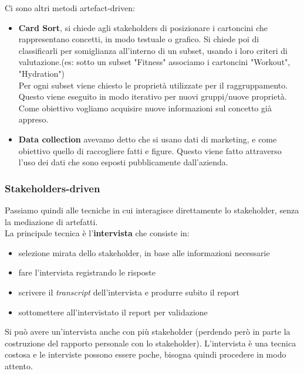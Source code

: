 Ci sono altri metodi artefact-driven:
\begin{itemize}
    \item \textbf{Card Sort}, si chiede agli stakeholders di posizionare i cartoncini che rappresentano concetti, in modo testuale o grafico. Si chiede poi di classificarli per somiglianza all'interno di un subset, usando i loro criteri di valutazione.(es: sotto un subset "Fitness" associamo i cartoncini "Workout", "Hydration") \\ Per ogni subset viene chiesto le proprietà utilizzate per il raggruppamento. Questo viene eseguito in modo iterativo per nuovi gruppi/nuove proprietà. Come obiettivo vogliamo acquisire nuove informazioni sul concetto già appreso. 
    \item \textbf{Data collection} avevamo detto che si usano dati di marketing, e come obiettivo quello di raccogliere fatti e figure. Questo viene fatto attraverso l'uso dei dati che sono esposti pubblicamente dall'azienda. 
\end{itemize}

\subsubsection{Stakeholders-driven}
Passiamo quindi alle tecniche in cui interagisce direttamente lo stakeholder, senza la mediazione di artefatti.\\
La principale tecnica è l'\textbf{intervista} che consiste in:
\begin{itemize}
  \item selezione mirata dello stakeholder, in base alle informazioni necessarie
  \item fare l'intervista registrando le risposte
  \item scrivere il \textit{transcript} dell'intervista e produrre subito il report
  \item sottomettere all'intervistato il report per validazione
\end{itemize}
Si può avere un'intervista anche con più stakeholder (perdendo però in parte la costruzione del rapporto personale con lo stakeholder). L'intervista è una tecnica costosa e le interviste possono essere poche, bisogna quindi procedere in modo attento.\\

